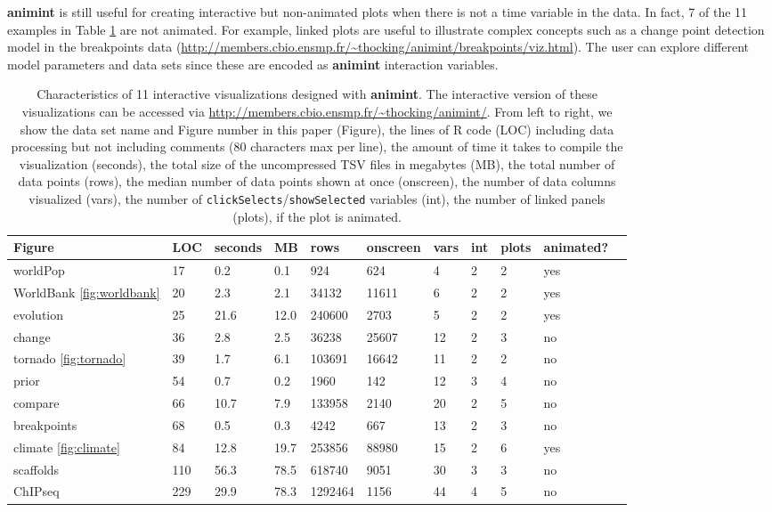 \documentclass[12pt,]{article}
\theoremstyle{definition}
\theoremstyle{definition}
\theoremstyle{definition}
\theoremstyle{remark}
\begin{document}
\textbf{animint} is still useful for creating interactive but
non-animated plots when there is not a time variable in the data. In
fact, 7 of the 11 examples in Table \ref{tab:examples} are not animated.
For example, linked plots are useful to illustrate complex concepts such
as a change point detection model in the breakpoints data
(\url{http://members.cbio.ensmp.fr/~thocking/animint/breakpoints/viz.html}).
The user can explore different model parameters and data sets since
these are encoded as \textbf{animint} interaction variables.

\begin{table}

\caption{
Characteristics of 11 interactive visualizations designed with
    \textbf{animint}. The interactive version of these visualizations can be accessed 
    via \url{http://members.cbio.ensmp.fr/~thocking/animint/}.
    From left to right, we show the data set name and 
    Figure number in this paper (Figure), the
    lines of R code (LOC) including data processing but not including comments
    (80 characters max per line),
    the amount of time it takes to compile the visualization (seconds),
    the total size of the uncompressed TSV files in megabytes (MB),
    the total number of data points (rows),
    the median number of data points shown at once (onscreen),
    the number of data columns visualized (vars),
    the number of \texttt{clickSelects}/\texttt{showSelected} 
    variables (int),
    the number of linked panels (plots),
    if the plot is animated.
}\label{tab:examples}

\begin{tabularx}{\textwidth}{|l|l|l|l|l|l|l|l|l|l|l|}
    \hline
 Figure & LOC & seconds & MB & rows & onscreen & vars & int & plots & animated? \\ 
  \hline
  worldPop & 17 & 0.2 & 0.1 & 924 & 624 &  4 &  2 &  2 & yes  \\ 
  WorldBank \ref{fig:worldbank} & 20 & 2.3 & 2.1 & 34132 & 11611 &  6 &  2 &  2 & yes \\ 
  evolution & 25 & 21.6 & 12.0 & 240600 & 2703 &  5 &  2 &  2 & yes  \\ 
  change & 36 & 2.8 & 2.5 & 36238 & 25607 & 12 &  2 &  3 & no  \\ 
  tornado  \ref{fig:tornado} & 39 & 1.7 & 6.1 & 103691 & 16642 & 11 &  2 &  2 & no \\ 
  prior & 54 & 0.7 & 0.2 & 1960 & 142 & 12 &  3 &  4 & no  \\ 
  compare & 66 & 10.7 & 7.9 & 133958 & 2140 & 20 &  2 &  5 & no  \\ 
  breakpoints & 68 & 0.5 & 0.3 & 4242 & 667 & 13 &  2 &  3 & no  \\ 
  climate \ref{fig:climate} & 84 & 12.8 & 19.7 & 253856 & 88980 & 15 &  2 &  6 & yes \\ 
  scaffolds & 110 & 56.3 & 78.5 & 618740 & 9051 & 30 &  3 &  3 & no  \\ 
  ChIPseq & 229 & 29.9 & 78.3 & 1292464 & 1156 & 44 &  4 &  5 & no  \\
  \hline
\end{tabularx}

\end{table}
\end{document}
